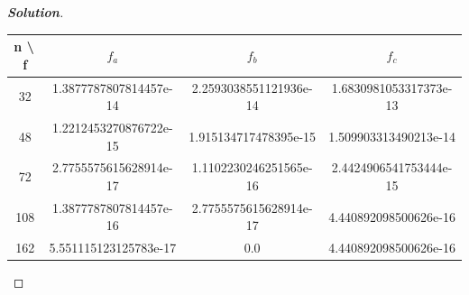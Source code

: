 \documentclass[11pt]{article}
\newenvironment{solution}{%
  \begin{proof}[\textbf{Solution}]$ $\par\nobreak\ignorespaces
}{%
  \end{proof}
}
\theoremstyle{definition}
\begin{document}
\begin{solution}
\begin{tabular}{c|c|c|c}
    n \textbackslash \,f & $f_a$ & $f_b$ & $f_c$ \\\hline
    32 & 1.3877787807814457e-14 & 2.2593038551121936e-14 & 1.6830981053317373e-13 \\
    48 & 1.2212453270876722e-15 & 1.915134717478395e-15 & 1.509903313490213e-14 \\
    72 & 2.7755575615628914e-17 & 1.1102230246251565e-16 & 2.4424906541753444e-15 \\
    108 & 1.3877787807814457e-16 & 2.7755575615628914e-17 & 4.440892098500626e-16 \\
    162 & 5.551115123125783e-17 & 0.0 & 4.440892098500626e-16
\end{tabular}
\end{solution}
\end{document}
